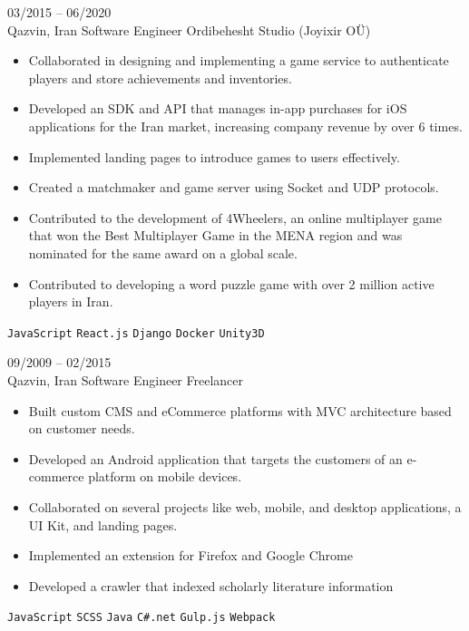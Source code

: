 \documentclass[8pt]{developercv} %
\begin{document}
\begin{entrylist}
        \entry
        {03/2015 -- 06/2020 \\ Qazvin, Iran}
        {Software Engineer}
        {Ordibehesht Studio {\small (Joyixir OÜ)}}
        {\vspace{-10pt}
            \begin{itemize}[noitemsep,topsep=0pt,parsep=0pt,partopsep=0pt, leftmargin=-1pt]
                \item Collaborated in designing and implementing a game service to authenticate players and store achievements and inventories.
                \item Developed an SDK and API that manages in-app purchases for iOS applications for the Iran market, increasing company revenue by over 6 times.
                \item Implemented landing pages to introduce games to users effectively.
                \item Created a matchmaker and game server using Socket and UDP protocols.
                \item Contributed to the development of 4Wheelers, an online multiplayer game that won the Best Multiplayer Game in the MENA region and was nominated for the same award on a global scale.
                \item Contributed to developing a word puzzle game with over 2 million active players in Iran.
            \end{itemize}
            \texttt{JavaScript} \slashsep \texttt{React.js} \slashsep \texttt{Django} \slashsep \texttt{Docker} \slashsep \texttt{Unity3D}
        }

        \entry
        {09/2009 -- 02/2015 \\ Qazvin, Iran}
        {Software Engineer}
        {Freelancer}
        {\vspace{-10pt}
            \begin{itemize}[noitemsep,topsep=0pt,parsep=0pt,partopsep=0pt, leftmargin=-1pt]
                \item Built custom CMS and eCommerce platforms with MVC architecture based on customer needs.
                \item Developed an Android application that targets the customers of an e-commerce platform on mobile devices.
                \item Collaborated on several projects like web, mobile, and desktop applications, a UI Kit, and landing pages.
                \item Implemented an extension for Firefox and Google Chrome
                \item Developed a crawler that indexed scholarly literature information
            \end{itemize}
            \texttt{JavaScript} \slashsep \texttt{SCSS} \slashsep \texttt{Java} \slashsep \texttt{C\#.net} \slashsep \texttt{Gulp.js} \slashsep \texttt{Webpack}
        }
    \end{entrylist}
\end{document}
